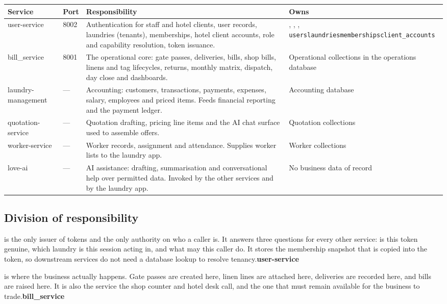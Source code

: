 \documentclass[11pt,a4paper,oneside]{book}
\begin{document}
\begin{center}\small
\begin{tabularx}{\linewidth}{|X|X|X|X|}
\hline
\rowcolor{lightgrey}
\textbf{Service} & \textbf{Port} & \textbf{Responsibility} & \textbf{Owns} \\ \hline
user-service & 8002 & Authentication for staff and hotel clients, user records, laundries (tenants), memberships, hotel client accounts, role and capability resolution, token issuance. & , , , \texttt{users}\texttt{laundries}\texttt{memberships}\texttt{client\_accounts} \\ \hline
bill\_service & 8001 & The operational core: gate passes, deliveries, bills, shop bills, linens and tag lifecycles, returns, monthly matrix, dispatch, day close and dashboards. & Operational collections in the operations database \\ \hline
laundry-management & — & Accounting: customers, transactions, payments, expenses, salary, employees and priced items. Feeds financial reporting and the payment ledger. & Accounting database \\ \hline
quotation-service & — & Quotation drafting, pricing line items and the AI chat surface used to assemble offers. & Quotation collections \\ \hline
worker-service & — & Worker records, assignment and attendance. Supplies worker lists to the laundry app. & Worker collections \\ \hline
love-ai & — & AI assistance: drafting, summarisation and conversational help over permitted data. Invoked by the other services and by the laundry app. & No business data of record \\ \hline
\end{tabularx}
\end{center}
\subsection*{Division of responsibility}
is the only issuer of tokens and the only authority on who a caller is. It answers three questions for every other service: is this token genuine, which laundry is this session acting in, and what may this caller do. It stores the membership snapshot that is copied into the token, so downstream services do not need a database lookup to resolve tenancy.\textbf{user-service}

is where the business actually happens. Gate passes are created here, linen lines are attached here, deliveries are recorded here, and bills are raised here. It is also the service the shop counter and hotel desk call, and the one that must remain available for the business to trade.\textbf{bill\_service}
\end{document}
